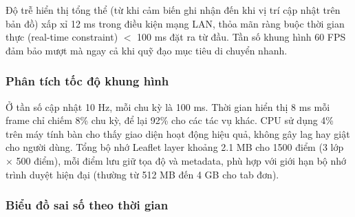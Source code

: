 \begin{table}[H]
\centering
{}
\caption{Hiệu năng giao diện trong phiên mô phỏng 60 giây, 10 Hz}
\label{tab:ui-perf}
\end{table}

Độ trễ hiển thị tổng thể (từ khi cảm biến ghi nhận đến khi vị trí cập nhật trên bản đồ) xấp xỉ 12 ms trong điều kiện mạng LAN, thỏa mãn ràng buộc thời gian thực (real-time constraint) $<$ 100 ms đặt ra từ đầu. Tần số khung hình 60 FPS đảm bảo mượt mà ngay cả khi quỹ đạo mục tiêu di chuyển nhanh.

\subsubsection{Phân tích tốc độ khung hình}

\hspace{0.5cm} Ở tần số cập nhật 10 Hz, mỗi chu kỳ là 100 ms. Thời gian hiển thị 8 ms mỗi frame chỉ chiếm 8\% chu kỳ, để lại 92\% cho các tác vụ khác. CPU sử dụng 4\% trên máy tính bàn cho thấy giao diện hoạt động hiệu quả, không gây lag hay giật cho người dùng. Tổng bộ nhớ Leaflet layer khoảng 2.1 MB cho 1500 điểm (3 lớp $\times$ 500 điểm), mỗi điểm lưu giữ tọa độ và metadata, phù hợp với giới hạn bộ nhớ trình duyệt hiện đại (thường từ 512 MB đến 4 GB cho tab đơn).

\subsubsection{Biểu đồ sai số theo thời gian}

